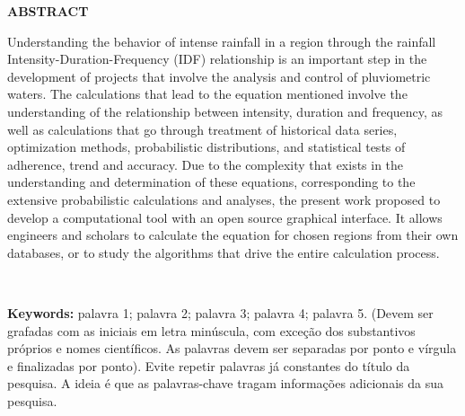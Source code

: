 \thispagestyle{empty}

\singlespacing
\begin{center}
	\textbf{ABSTRACT}
\end{center}

\noindent Understanding the behavior of intense rainfall in a region through the rainfall Intensity-Duration-Frequency (IDF) relationship is an important step in the development of projects that involve the analysis and control of pluviometric waters. The calculations that lead to the equation mentioned involve the understanding of the relationship between intensity, duration and frequency, as well as calculations that go through treatment of historical data series, optimization methods, probabilistic distributions, and statistical tests of adherence, trend and accuracy. Due to the complexity that exists in the understanding and determination of these equations, corresponding to the extensive probabilistic calculations and analyses, the present work proposed to develop a computational tool with an open source graphical interface. It allows engineers and scholars to calculate the equation for chosen regions from their own databases, or to study the algorithms that drive the entire calculation process.

\ \

\noindent \textbf{Keywords:} palavra 1; palavra 2; palavra 3; palavra 4; palavra 5. (Devem ser grafadas com as iniciais em letra minúscula, com exceção dos substantivos próprios e nomes científicos. As palavras devem ser separadas por ponto e vírgula e finalizadas por ponto). Evite repetir palavras já constantes do título da pesquisa. A ideia é que as palavras-chave tragam informações adicionais da sua pesquisa.
\newpage
